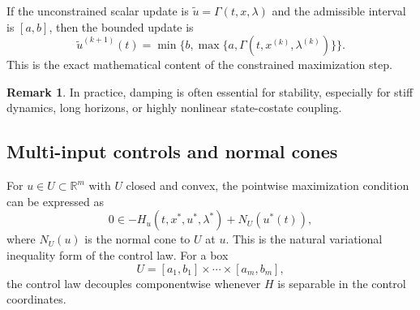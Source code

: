 \documentclass[11pt]{article}
\theoremstyle{definition}
\newtheorem{remark}{Remark}
\newcommand{\R}{\mathbb{R}}
\begin{document}
If the unconstrained scalar update is $\tilde u = \Gamma(t,x,\lambda)$ and the admissible interval is $[a,b]$, then the bounded update is
\[
\tilde u^{(k+1)}(t)=\min\{b,\max\{a,\Gamma(t,x^{(k)},\lambda^{(k)})\}\}.
\]
This is the exact mathematical content of the constrained maximization step.

\begin{remark}
In practice, damping is often essential for stability, especially for stiff dynamics, long horizons, or highly nonlinear state-costate coupling.
\end{remark}

\subsection{Multi-input controls and normal cones}

For $u\in U\subset \R^m$ with $U$ closed and convex, the pointwise maximization condition can be expressed as
\[
0 \in -H_u(t,x^*,u^*,\lambda^*) + N_U(u^*(t)),
\]
where $N_U(u)$ is the normal cone to $U$ at $u$. This is the natural variational inequality form of the control law. For a box
\[
U=[a_1,b_1]\times \cdots \times [a_m,b_m],
\]
the control law decouples componentwise whenever $H$ is separable in the control coordinates.
\end{document}
